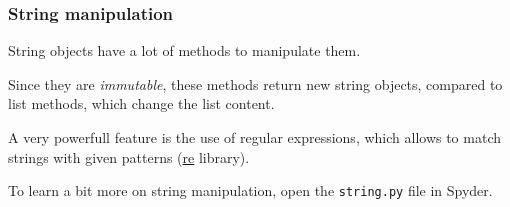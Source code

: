     \begin{frame}[fragile]
        \frametitle{String manipulation}

        String objects have a lot of methods to manipulate them. 
        \vspace{1em}

        Since they are \emph{immutable}, these methods return new string objects, compared to list methods, which
        change the list content.

    \vspace{1em}
    A very powerfull feature is the use of regular expressions, which allows to match strings with given patterns (\href{https://docs.python.org/3/library/re.html}{re} library).

    \vspace{1em}
    To learn a bit more on string manipulation, open the \verb+string.py+ file in Spyder.
\end{frame}
